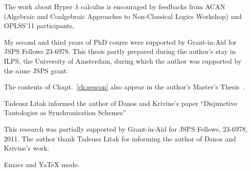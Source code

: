 \begin{acknowledge}
 The work about Hyper $\lambda$ calculus is encouraged by feedbacks from
 ACAN (Algebraic and
 Coalgebraic
 Approaches to
 Non-Classical Logics Workshop) and OPLSS'11 participants,

 My second and third years of PhD course were
 supported by Grant-in-Aid for JSPS Fellows 23-6978.
 This thesis partly prepared during the author's stay in
 ILPS, the University of Amsterdam, during which the author was supported
 by the same JSPS grant.

 The contents of Chapt.~\ref{ch:seqcon} also appear in the author's
 Master's Thesis~\citep{hiraimaster}.

 Tadeusz Litak informed the author of Danos and Krivine's paper
 ``Disjunctive Tautologies as Synchronisation Schemes''

 This research was partially supported by
 Grant-in-Aid for JSPS Fellows, 23-6978, 2011.
 The author thank Tadeusz Litak for informing the author of
 Danos and Krivine's work.

 Emacs and YaTeX mode.
\end{acknowledge}
